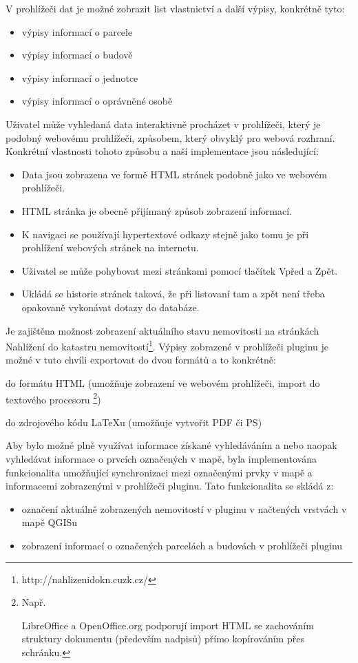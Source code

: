 \documentclass[a4paper,10pt]{article}
\begin{document}
V prohlížeči dat je možné zobrazit list vlastnictví a další výpisy, konkrétně tyto:
\begin{itemize}
        \item výpisy informací o parcele
        \item výpisy informací o budově
        \item výpisy informací o jednotce
        \item výpisy informací o oprávněné osobě
\end{itemize}
Uživatel může vyhledaná data interaktivně procházet v prohlížeči, který je podobný webovému prohlížeči,
způsobem, který obvyklý pro webová rozhraní.
Konkrétní vlastnosti tohoto způsobu a naší implementace jsou následující:
\begin{itemize}
\item Data jsou zobrazena ve formě HTML stránek podobně jako ve webovém prohlížeči.
\item HTML stránka je obecně přijímaný způsob zobrazení informací.
\item K navigaci se používají hypertextové odkazy stejně jako tomu je při prohlížení webových stránek na internetu.
\item Uživatel se může pohybovat mezi stránkami pomocí tlačítek Vpřed a Zpět.
\item Ukládá se historie stránek taková, že při listovaní tam a zpět není třeba opakovaně vykonávat dotazy do databáze.
\end{itemize}
Je zajištěna možnost zobrazení aktuálního stavu nemovitosti na stránkách Nahlížení do katastru nemovitostí\footnote{http://nahlizenidokn.cuzk.cz/}.
Výpisy zobrazené v prohlížeči pluginu je možné v tuto chvíli exportovat do dvou formátů a to konkrétně:

\begin{itemize}
\item do formátu HTML (umožňuje zobrazení ve webovém prohlížeči, import do textového procesoru \footnote{Např. \item LibreOffice a OpenOffice.org podporují import HTML se zachováním struktury dokumentu (především nadpisů) přímo kopírováním přes schránku.})
\item do zdrojového kódu LaTeXu (umožňuje vytvořit PDF či PS)
\end{itemize}

Aby bylo možné plně využívat informace získané vyhledáváním a nebo naopak vyhledávat informace o prvcích označených v mapě, byla implementována funkcionalita umožňující synchronizaci mezi označenými prvky v mapě a informacemi zobrazenými v prohlížeči pluginu. Tato funkcionalita se skládá z:
\begin{itemize}
\item označení aktuálně zobrazených nemovitostí v pluginu v načtených vrstvách v mapě QGISu
\item zobrazení informací o označených parcelách a budovách v prohlížeči pluginu
\end{itemize}
\end{document}
